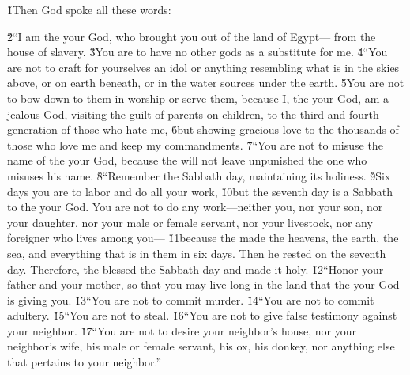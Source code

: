 \v{1}Then God spoke all these words:
\begin{bulletlist}
 \v{2}``I am the  your God, who brought you out of the land of Egypt--- from the house of slavery. \v{3}You are to have no other gods as a substitute for me.
 \v{4}``You are not to craft for yourselves an idol or anything resembling what is in the skies above, or on earth beneath, or in the water sources under the earth. \v{5}You are not to bow down to them in worship or serve them, because I, the  your God, am a jealous God, visiting the guilt of parents on children, to the third and fourth generation of those who hate me, \v{6}but showing gracious love to the thousands of those who love me and keep my commandments.
 \v{7}``You are not to misuse the name of the  your God, because the  will not leave unpunished the one who misuses his name.
 \v{8}``Remember the Sabbath day, maintaining its holiness. \v{9}Six days you are to labor and do all your work, \v{10}but the seventh day is a Sabbath to the  your God. You are not to do any work---neither you, nor your son, nor your daughter, nor your male or female servant, nor your livestock, nor any foreigner who lives among you--- \v{11}because the  made the heavens, the earth, the sea, and everything that is in them in six days. Then he rested on the seventh day. Therefore, the  blessed the Sabbath day and made it holy.
 \v{12}``Honor your father and your mother, so that you may live long in the land that the  your God is giving you.
 \v{13}``You are not to commit murder.
 \v{14}``You are not to commit adultery.
 \v{15}``You are not to steal.
 \v{16}``You are not to give false testimony against your neighbor.
 \v{17}``You are not to desire your neighbor's house, nor your neighbor's wife, his male or female servant, his ox, his donkey, nor anything else that pertains to your neighbor.''
\end{bulletlist}

